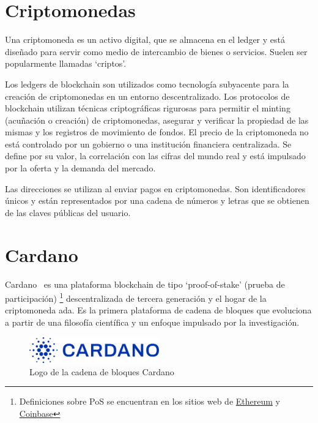 \documentclass[12pt]{book}
\begin{document}
\section{Criptomonedas}

Una criptomoneda es un activo digital, que se almacena en el ledger y está diseñado para servir como medio de intercambio de bienes o servicios. Suelen ser popularmente llamadas `criptos'.

Los ledgers de blockchain son utilizados como tecnología subyacente para la creación de criptomonedas en un entorno descentralizado. Los protocolos de blockchain utilizan técnicas criptográficas rigurosas para permitir el minting (acuñación o creación) de criptomonedas, asegurar y verificar la propiedad de las mismas y los registros de movimiento de fondos. El precio de la criptomoneda no está controlado por un gobierno o una institución financiera centralizada. Se define por su valor, la correlación con las cifras del mundo real y está impulsado por la oferta y la demanda del mercado.

Las direcciones se utilizan al enviar pagos en criptomonedas. Son identificadores únicos y están representados por una cadena de números y letras que se obtienen de las claves públicas del usuario.

\section{Cardano}

Cardano~\cite{cardano_docs} es una plataforma blockchain de tipo `proof-of-stake' (prueba de participación)
\footnote{Definiciones sobre PoS se encuentran en los sitios web de \href{https://ethereum.org/en/developers/docs/consensus-mechanisms/pos/}{Ethereum} y \href{https://www.coinbase.com/es/learn/crypto-basics/what-is-proof-of-work-or-proof-of-stake}{Coinbase}}
descentralizada de tercera generación y el hogar de la criptomoneda ada. Es la primera plataforma de cadena de bloques que evoluciona a partir de una filosofía científica y un enfoque impulsado por la investigación.

\begin{figure}[H]
    \centering
    \includegraphics[width=0.5\textwidth]{Cardano_logo.png}
    \caption{Logo de la cadena de bloques Cardano}\label{fig:Cardano_logo}
\end{figure}
\end{document}

